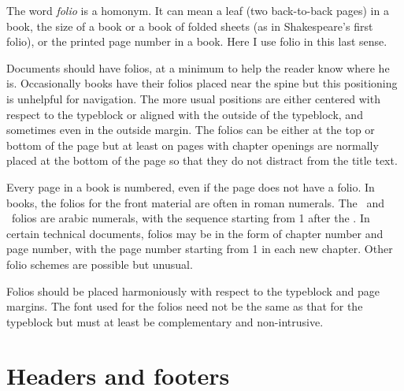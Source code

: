 \documentclass[10pt,a4paper,oneside,extrafontsizes]{memoir}%
\begin{document}
\begin{paracol}{2}
\switchEng
    The word \emph{folio} is a homonym. It can mean a leaf 
(two back-to-back pages) in a book, the size of a book or a book of
folded sheets (as in Shakespeare's first folio), or the printed page number
in a book. Here I use folio in this last sense.

    Documents should have folios, at a minimum to help the reader know where
he is. Occasionally books have their folios placed near the spine but this
positioning is unhelpful for navigation. The more usual positions are
either centered with respect to the typeblock or aligned 
with the outside of the typeblock, and sometimes even in 
the outside margin. The folios
can be either at the top or bottom of the page but at least on pages 
with chapter openings are normally placed at the bottom of 
the page so that they do not distract from the title text.

    Every page in a book is numbered, even if the page does not have a folio. 
In books, the folios for the front material are often in roman numerals.
The \pixmainmatter\ and \pixbackmatter\ folios are arabic numerals, 
with the sequence
starting from 1 after the \pixfrontmatter. In certain technical documents,
folios may be in the form of chapter number and 
page number, with the page number starting from 1 in each new chapter. 
Other folio schemes are possible but unusual.

    Folios should be placed harmoniously with respect to the 
typeblock and page margins. The font used for 
the folios need not be the same as that for the typeblock 
but must at least be complementary and non-intrusive.
\end{paracol}

\section{Headers and footers}
\end{document}
